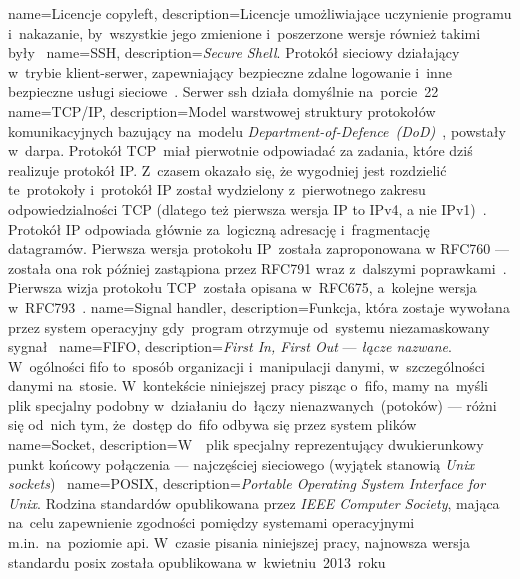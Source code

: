 {
	name={Licencje copyleft},
	description={Licencje umożliwiające uczynienie programu  i~nakazanie, by~wszystkie jego zmienione i~poszerzone wersje również takimi były~\cite{copyleft,wiki:licenses-comparison}}
}
{
	name={SSH},
	description={\emph{Secure Shell}. Protokół sieciowy działający w~trybie klient-serwer, zapewniający bezpieczne zdalne logowanie i~inne bezpieczne usługi sieciowe~\cite{rfc:ssh}. Serwer \gls{ssh} działa domyślnie na~porcie~22}
}
{
	name={TCP/IP},
	description={Model warstwowej struktury protokołów komunikacyjnych bazujący na~modelu \emph{Department-of-Defence~(DoD)}~\cite{rfc:tcpip-dod}, powstały w~\gls{darpa}. Protokół TCP~miał pierwotnie odpowiadać za zadania, które dziś realizuje protokół IP. Z~czasem okazało się, że wygodniej jest rozdzielić te~protokoły i~protokół IP został wydzielony z~pierwotnego zakresu odpowiedzialności TCP (dlatego też pierwsza wersja IP to IPv4, a nie IPv1)~\cite{tcpguide-tcpip-history}. Protokół IP odpowiada głównie za~logiczną adresację i~fragmentację datagramów. Pierwsza wersja protokołu IP~została zaproponowana w RFC760 --- została ona rok później zastąpiona przez RFC791 wraz z~dalszymi poprawkami~\cite{rfc:ip-rfc760,rfc:ip-rfc791}. Pierwsza wizja protokołu TCP~została opisana w~RFC675, a~kolejne wersja w~RFC793~\cite{rfc:tcp-rfc675,rfc:ip-rfc793}.}
}
{
	name={Signal handler},
	description={Funkcja, która zostaje wywołana przez system operacyjny gdy~program otrzymuje od~systemu niezamaskowany sygnał~\cite{signal-handler}}
}
{
	name={FIFO},
	description={\emph{First In, First Out} --- \emph{łącze nazwane}. W~ogólności \gls{fifo} to~sposób organizacji i~manipulacji danymi, w~szczególności danymi na~stosie. W~kontekście niniejszej pracy pisząc o~\gls{fifo}, mamy na~myśli plik specjalny podobny w~działaniu do~łączy nienazwanych~(potoków) --- różni się od~nich tym, że~dostęp do~\gls{fifo} odbywa się przez system plików~\cite{fifo-manual}}
}
{
	name={Socket},
	description={W~~plik specjalny reprezentujący dwukierunkowy punkt końcowy połączenia --- najczęściej sieciowego (wyjątek stanowią \emph{Unix sockets})~\cite{socket-definition-oracle}}
}
{
	name={\mbox{POSIX}},
	description={\emph{Portable Operating System Interface for Unix}. Rodzina standardów opublikowana przez \emph{IEEE Computer Society}, mająca na~celu zapewnienie zgodności pomiędzy systemami operacyjnymi m.in.~na~poziomie \acrshort{api}. W~czasie pisania niniejszej pracy, najnowsza wersja standardu \gls{posix} została opublikowana w~kwietniu~2013~roku~\cite{posix-ieee,posix-opengroup}}
}
